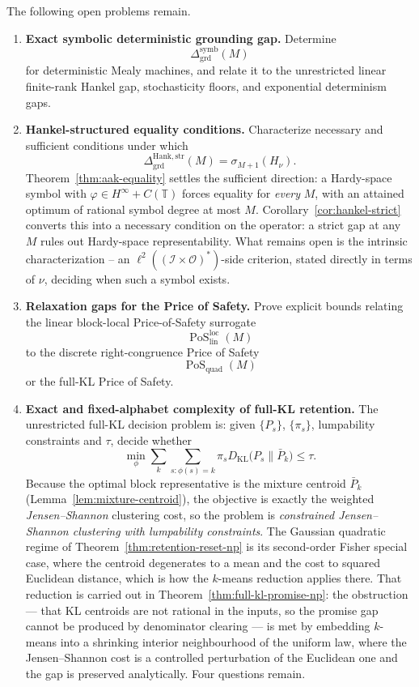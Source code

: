 \documentclass[12pt]{article}
\theoremstyle{definition}
\DeclareMathOperator{\PoS}{PoS}
\newcommand{\DHankstr}{\Delta_{\mathrm{grd}}^{\mathrm{Hank,str}}}
\newcommand{\PoSlin}{\PoS_{\mathrm{lin}}^{\mathrm{loc}}}
\newcommand{\PoSquad}{\PoS_{\mathrm{quad}}}
\newcommand{\KL}{D_{\mathrm{KL}}}
\begin{document}
The following open problems remain.

\begin{enumerate}[leftmargin=2.0em]
\item \textbf{Exact symbolic deterministic grounding gap.}
Determine
\[
\Delta_{\mathrm{grd}}^{\mathrm{symb}}(M)
\]
for deterministic Mealy machines, and relate it to the unrestricted linear
finite-rank Hankel gap, stochasticity floors, and exponential determinism
gaps.

\item \textbf{Hankel-structured equality conditions.}
Characterize necessary and sufficient conditions under which
\[
\DHankstr(M)
=
\sigma_{M+1}(H_\nu).
\]
Theorem~\ref{thm:aak-equality} settles the sufficient direction: a Hardy-space
symbol with $\varphi\in H^\infty+C(\mathbb T)$ forces equality for
\emph{every} $M$, with an attained optimum of rational symbol degree at most
$M$.  Corollary~\ref{cor:hankel-strict} converts this into a necessary
condition on the operator: a strict gap at any $M$ rules out Hardy-space
representability.  What remains open is the intrinsic characterization -- an
$\ell^2((\mathcal I\times\mathcal O)^*)$-side criterion, stated directly in
terms of $\nu$, deciding when such a symbol exists.

\item \textbf{Relaxation gaps for the Price of Safety.}
Prove explicit bounds relating the linear block-local Price-of-Safety
surrogate
\[
\PoSlin(M)
\]
to the discrete right-congruence Price of Safety
\[
\PoSquad(M)
\]
or the full-KL Price of Safety.

\item \textbf{Exact and fixed-alphabet complexity of full-KL retention.}
The unrestricted full-KL decision problem is: given $\{P_s\}$, $\{\pi_s\}$,
lumpability constraints and $\tau$, decide whether
\[
\min_{\phi}
\sum_k\sum_{s:\phi(s)=k}\pi_s\KL\bigl(P_s\|\bar P_k\bigr)
\le\tau .
\]
Because the optimal block representative is the mixture centroid
$\bar P_k$ (Lemma~\ref{lem:mixture-centroid}), the objective is exactly the
weighted \emph{Jensen--Shannon} clustering cost, so the problem is
\emph{constrained Jensen--Shannon clustering with lumpability constraints}.
The Gaussian quadratic regime of Theorem~\ref{thm:retention-reset-np} is its
second-order Fisher special case, where the centroid degenerates to a mean and
the cost to squared Euclidean distance, which is how the $k$-means reduction
applies there.  That reduction is carried out in Theorem~\ref{thm:full-kl-promise-np}: the
obstruction --- that KL centroids are not rational in the inputs, so the
promise gap cannot be produced by denominator clearing --- is met by embedding
$k$-means into a shrinking interior neighbourhood of the uniform law, where the
Jensen--Shannon cost is a controlled perturbation of the Euclidean one and the
gap is preserved analytically.  Four questions remain.


\end{enumerate}
\end{document}
